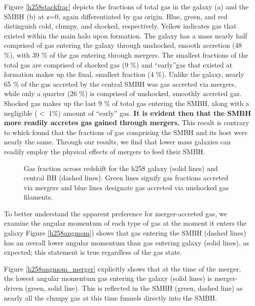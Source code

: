 \documentclass[12pt,headA,chapB]{fiskthesis}
\begin{document}
Figure \ref{h258stackfrac} depicts the fractions of total gas in the galaxy (a) and the SMBH (b) at z=0, again differentiated by gas origin. Blue, green, and red distinguish cold, clumpy, and shocked, respectively. Yellow indicates gas that existed within the main halo upon formation. The galaxy has a mass nearly half comprised of gas entering the galaxy through unshocked, smooth accretion (48 \%), with 39 \% of the gas entering through mergers. The smallest fractions of the total gas are comprised of shocked gas (9 \%) and ``early''gas that existed at formation makes up the final, smallest fraction (4 \%). Unlike the galaxy, nearly 65 \% of the gas accreted by the central SMBH was gas accreted via mergers, while only a quarter (26 \%) is comprised of unshocked, smoothly accreted gas. Shocked gas makes up the last 9 \% of total gas entering the SMBH, along with a negligible ($<$ 1\%) amount of ``early'' gas. \textbf{It is evident then that the SMBH more readily accretes gas gained through mergers.} This result is contrary to \cite{Bellovary2013} which found that the fractions of gas comprising the SMBH and its host were nearly the same. Through our results, we find that lower mass galaxies can readily employ the physical effects of mergers to feed their SMBH.

\begin{figure}[h]
\centerline{}
\caption[GASOLINE h258 Galaxy and SMBH Gas Fractions Across Time]{Gas fraction across redshift for the h258 galaxy (solid lines) and central BH (dashed lines). Green lines signify gas fractions accreted via mergers and blue lines designate gas accreted via unshocked gas filaments.}
\label{h258numfrac} 
\end{figure}

To better understand the apparent preference for merger-accreted gas, we examine the angular momentum of each type of gas at the moment it enters the galaxy Figure \ref{h258angmom}) shows that gas entering the SMBH (dashed lines) has an overall lower angular momentum than gas entering galaxy (solid lines), as expected; this statement is true regardless of the gas state. 

Figure \ref{h258angmom_merger} explicitly shows that at the time of the merger, the lowest angular momentum gas entering the galaxy (solid lines) is merger-driven (green, solid line). This is reflected in the SMBH (green, dashed line) as nearly all the clumpy gas at this time funnels directly into the SMBH.
\end{document}
